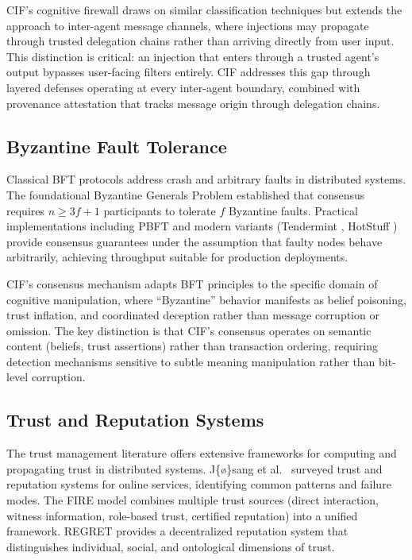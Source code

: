 \documentclass[
]{article}
\begin{document}
CIF's cognitive firewall draws on similar classification techniques but
extends the approach to inter-agent message channels, where injections
may propagate through trusted delegation chains rather than arriving
directly from user input. This distinction is critical: an injection
that enters through a trusted agent's output bypasses user-facing
filters entirely. CIF addresses this gap through layered defenses
operating at every inter-agent boundary, combined with provenance
attestation that tracks message origin through delegation chains.

\subsection{Byzantine Fault Tolerance}\label{byzantine-fault-tolerance}

Classical BFT protocols \cite{lamport1982byzantine, dwork1988consensus}
address crash and arbitrary faults in distributed systems. The
foundational Byzantine Generals Problem established that consensus
requires \(n \geq 3f + 1\) participants to tolerate \(f\) Byzantine
faults. Practical implementations including PBFT
\cite{castro1999practical} and modern variants (Tendermint
\cite{buchman2016tendermint}, HotStuff \cite{yin2019hotstuff}) provide
consensus guarantees under the assumption that faulty nodes behave
arbitrarily, achieving throughput suitable for production deployments.

CIF's consensus mechanism adapts BFT principles to the specific domain
of cognitive manipulation, where ``Byzantine'' behavior manifests as
belief poisoning, trust inflation, and coordinated deception rather than
message corruption or omission. The key distinction is that CIF's
consensus operates on semantic content (beliefs, trust assertions)
rather than transaction ordering, requiring detection mechanisms
sensitive to subtle meaning manipulation rather than bit-level
corruption.

\subsection{Trust and Reputation
Systems}\label{trust-and-reputation-systems}

The trust management literature offers extensive frameworks for
computing and propagating trust in distributed systems. J\{\o\}sang et
al.~\cite{josang2007survey} surveyed trust and reputation systems for
online services, identifying common patterns and failure modes. The FIRE
model \cite{huynh2006fire} combines multiple trust sources (direct
interaction, witness information, role-based trust, certified
reputation) into a unified framework. REGRET \cite{sabater2001regret}
provides a decentralized reputation system that distinguishes
individual, social, and ontological dimensions of trust.
\end{document}
